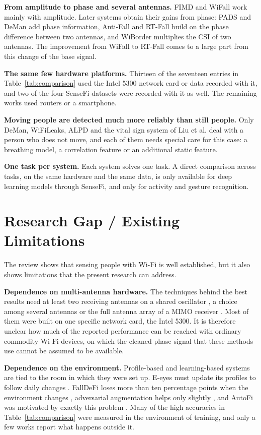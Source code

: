 \textbf{From amplitude to phase and several antennas.} FIMD and WiFall work mainly with amplitude. Later systems obtain their gains from phase: PADS and DeMan add phase information, Anti-Fall and RT-Fall build on the phase difference between two antennas, and WiBorder multiplies the CSI of two antennas. The improvement from WiFall to RT-Fall comes to a large part from this change of the base signal.

\textbf{The same few hardware platforms.} Thirteen of the seventeen entries in Table~\ref{tab:comparison} used the Intel 5300 network card or data recorded with it, and two of the four SenseFi datasets were recorded with it as well. The remaining works used routers or a smartphone.

\textbf{Moving people are detected much more reliably than still people.} Only DeMan, WiFiLeaks, ALPD and the vital sign system of Liu et al. deal with a person who does not move, and each of them needs special care for this case: a breathing model, a correlation feature or an additional static feature.

\textbf{One task per system.} Each system solves one task. A direct comparison across tasks, on the same hardware and the same data, is only available for deep learning models through SenseFi, and only for activity and gesture recognition.

\section{Research Gap / Existing Limitations}
\label{sec:gap}
The review shows that sensing people with Wi-Fi is well established, but it also shows limitations that the present research can address.

\textbf{Dependence on multi-antenna hardware.} The techniques behind the best results need at least two receiving antennas on a shared oscillator \cite{antifall,rtfall,wiborder}, a choice among several antennas \cite{thude} or the full antenna array of a MIMO receiver \cite{pads}. Most of them were built on one specific network card, the Intel 5300. It is therefore unclear how much of the reported performance can be reached with ordinary commodity Wi-Fi devices, on which the cleaned phase signal that these methods use cannot be assumed to be available.

\textbf{Dependence on the environment.} Profile-based and learning-based systems are tied to the room in which they were set up. E-eyes must update its profiles to follow daily changes \cite{eeyes}. FallDeFi loses more than ten percentage points when the environment changes \cite{falldefi}, adversarial augmentation helps only slightly \cite{adafall}, and AutoFi was motivated by exactly this problem \cite{autofi}. Many of the high accuracies in Table~\ref{tab:comparison} were measured in the environment of training, and only a few works report what happens outside it.

